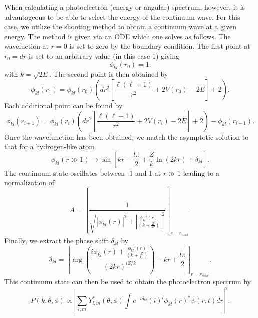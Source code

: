 When calculating a photoelectron (energy or angular) spectrum, however, it is advantageous to be able to select the energy of the continuum wave. For this case, we utilize the shooting method \cite{sauer2012} to obtain a continuum wave at a given energy. The method is given via an ODE which one solves as follows. The wavefuction at $r=0$ is set to zero by the boundary condition. The first point at $r_0=dr$ is set to an arbitrary value (in this case 1) giving 
\begin{equation}
    \phi_{kl}(r_0) = 1.
\end{equation}
with $k=\sqrt{2E}$. The second point is then obtained by
\begin{equation}
    \phi_{kl}(r_1) = \phi_{kl}(r_0) \left(dr^2\left[\frac{\ell (\ell+1)}{r^2} + 2V(r_0) -2 E\right]+2 \right). 
\end{equation}
Each additional point can be found by 
\begin{equation}
    \phi_{kl}(r_{i+1}) = \phi_{kl}(r_i) \left(dr^2\left[\frac{\ell (\ell+1)}{r^2} + 2V(r_i) -2 E\right]+2 \right) - \phi_{kl}(r_{i-1}).
\end{equation}
Once the wavefunction has been obtained, we match the asymptotic solution to that for a hydrogen-like atom
\begin{equation}
  \phi_{kl}(r\gg1) \rightarrow \sin\left[kr - \frac{l\pi}{2} +\frac{Z}{k} \ln(2kr) + \delta_{kl} \right].
\end{equation}
The continuum state oscillates between -1 and 1 at $r\gg1$ leading to a normalization of
\begin{equation}
  A = \left[\frac{1}{\sqrt{|\phi_{kl}(r)|^2 + \left|\frac{\phi_{kl}'(r)}{(k+\frac{Z}{kr})}\right|^2}} \right]_{r=r_{max}}.
\end{equation}
Finally, we extract the phase shift $\delta_{kl}$ by
\begin{equation}
    \delta_{kl} = \left[\arg\left(\frac{i\phi_{kl}(r) + \frac{\phi_{kl}'(r)}{(k+\frac{Z}{kr})} }{(2kr)^{iZ/k}}\right) - kr + \frac{l\pi}{2} \right]_{r=r_{max}}.
\end{equation}
This continuum state can then be used to obtain the photoelectron spectrum by 
\begin{equation}
    P(k,\theta,\phi) \propto \left|\sum_{l,m} Y_{l,m}^*(\theta,\phi)\int  e^{-i\delta_{kl}}(i)^l \phi_{kl}(r)^* \psi(r,t) dr \right|^2.
\end{equation}

